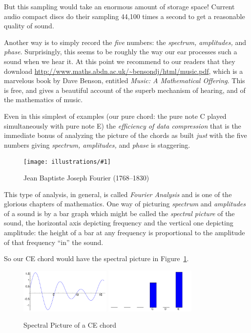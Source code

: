 \documentclass[11pt,draft]{article}
\newcommand{\ill}[3]{ 
   \begin{figure}[H]
   \begin{center}
   \texttt{[image: illustrations/\#1]}
   \caption{#3}
   \end{center}
    \end{figure}
}
\theoremstyle{plain}
\theoremstyle{definition}
\numberwithin{equation}{section}
\numberwithin{figure}{section}
\numberwithin{table}{section}
\begin{document}
But this sampling would take an enormous amount of storage space!
Current audio compact discs do their sampling 44,100 times a second to
get a reasonable quality of sound.

Another way is to simply record the {\em five} numbers: the {\em
  spectrum, amplitudes,} and {\em phase}.  Surprisingly, this seems to
be roughly the way our ear processes such a sound when we hear it.  At
this point we recommend to our readers that they download
\url{http://www.maths.abdn.ac.uk/~bensondj/html/music.pdf}, which is a
marvelous book by Dave Benson, entitled {\em Music: A Mathematical
  Offering}. This is free, and gives a beautiful account of the superb
mechanism of hearing, and of the mathematics of music.

  Even in this simplest of examples (our pure chord: the pure note C
  played simultaneously with pure note E) the {\em efficiency of data
    compression} that is the immediate bonus of analyzing the picture
  of the chords as built {\em just} with the five numbers giving {\em
    spectrum, amplitudes,} and {\em phase} is staggering.

\ill{fourier}{0.3}{Jean Baptiste Joseph Fourier (1768--1830)}

This type of analysis, in general, is called {\em Fourier Analysis}
and is one of the glorious chapters of mathematics.  One way of
picturing {\em spectrum} and {\em amplitudes} of a sound is by a bar
graph which might be called the {\em spectral picture} of the sound,
the horizontal axis depicting frequency and the vertical one depicting
amplitude: the height of a bar at any frequency is proportional to the
amplitude of that frequency ``in'' the sound.
 
So our CE chord would have the spectral picture in
Figure~\ref{fig:ce-spectral}.
 
\begin{figure}[H]
\begin{center}
\includegraphics[width=0.4\textwidth]{illustrations/sound-ce-general_sum}
\includegraphics[width=0.4\textwidth]{illustrations/sound-ce-general_sum-blips}
\end{center}
\caption{Spectral Picture of a CE chord\label{fig:ce-spectral}}
\end{figure}
\end{document}
